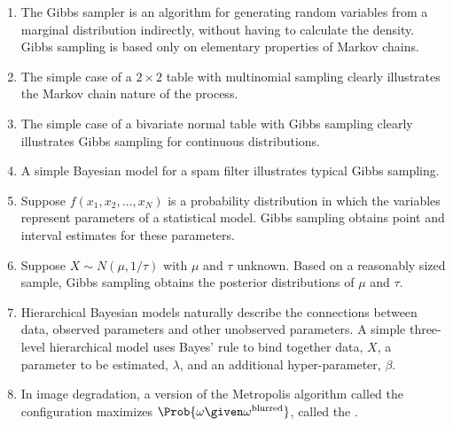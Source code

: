 \documentclass[12pt]{article}
\begin{document}
\begin{enumerate}
    \item
        The Gibbs sampler is an algorithm for generating random
        variables from a marginal distribution indirectly, without
        having to calculate the density.  Gibbs sampling is based only
        on elementary properties of Markov chains.
    \item
        The simple case of a \( 2 \times 2 \) table with multinomial
        sampling clearly illustrates the Markov chain nature of the
        process.
    \item
        The simple case of a bivariate normal table with Gibbs sampling
        clearly illustrates Gibbs sampling for continuous distributions.
    \item
        A simple Bayesian model for a spam filter illustrates typical
        Gibbs sampling.
    \item
        Suppose \( f(x_1, x_2, \dots, x_N) \) is a probability
        distribution in which the variables represent parameters of a
        statistical model. Gibbs sampling obtains point and interval
        estimates for these parameters.
    \item
        Suppose \( X \sim N(\mu, 1/\tau) \) with \( \mu \) and \( \tau \)
        unknown.  Based on a reasonably sized sample, Gibbs sampling
        obtains the posterior distributions of \( \mu \) and \( \tau \).
    \item
        Hierarchical Bayesian models naturally describe the connections
        between data, observed parameters and other unobserved
        parameters.  A simple three-level hierarchical model uses Bayes'
        rule to bind together data, \( X \), a parameter to be
        estimated, \( \lambda \), and an additional hyper-parameter, \(
        \beta \).
    \item
        In image degradation, a version of the Metropolis algorithm
        called  the configuration maximizes \(
        \Prob{\omega \given \omega^{\text{blurred}}} \), called the
        .
\end{enumerate}

\hr

\end{document}
